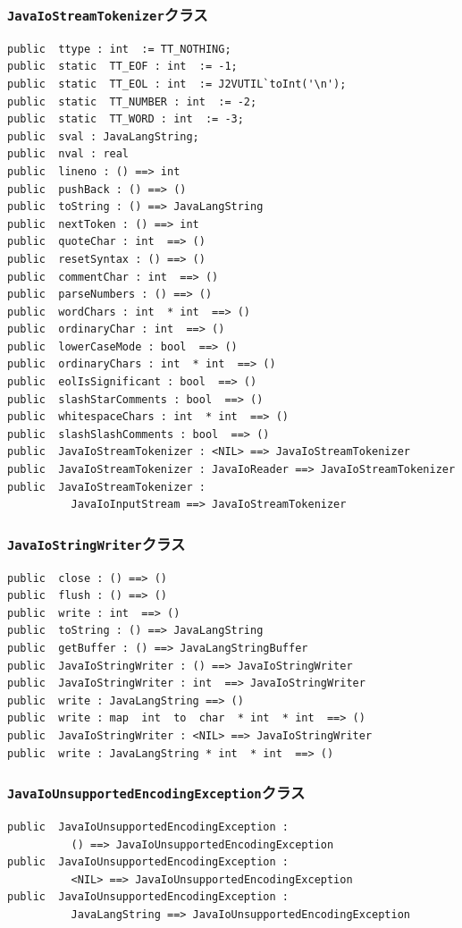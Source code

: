 \documentclass[\pformat,12pt]{jarticle}
\begin{document}
\subsubsection{\texttt{JavaIoStreamTokenizer}クラス}
\begin{small}
\begin{verbatim}
public  ttype : int  := TT_NOTHING;
public  static  TT_EOF : int  := -1;
public  static  TT_EOL : int  := J2VUTIL`toInt('\n');
public  static  TT_NUMBER : int  := -2;
public  static  TT_WORD : int  := -3;
public  sval : JavaLangString;
public  nval : real
public  lineno : () ==> int
public  pushBack : () ==> ()
public  toString : () ==> JavaLangString
public  nextToken : () ==> int
public  quoteChar : int  ==> ()
public  resetSyntax : () ==> ()
public  commentChar : int  ==> ()
public  parseNumbers : () ==> ()
public  wordChars : int  * int  ==> ()
public  ordinaryChar : int  ==> ()
public  lowerCaseMode : bool  ==> ()
public  ordinaryChars : int  * int  ==> ()
public  eolIsSignificant : bool  ==> ()
public  slashStarComments : bool  ==> ()
public  whitespaceChars : int  * int  ==> ()
public  slashSlashComments : bool  ==> ()
public  JavaIoStreamTokenizer : <NIL> ==> JavaIoStreamTokenizer
public  JavaIoStreamTokenizer : JavaIoReader ==> JavaIoStreamTokenizer
public  JavaIoStreamTokenizer : 
          JavaIoInputStream ==> JavaIoStreamTokenizer
\end{verbatim}
\end{small}

\subsubsection{\texttt{JavaIoStringWriter}クラス}
\begin{small}
\begin{verbatim}
public  close : () ==> ()
public  flush : () ==> ()
public  write : int  ==> ()
public  toString : () ==> JavaLangString
public  getBuffer : () ==> JavaLangStringBuffer
public  JavaIoStringWriter : () ==> JavaIoStringWriter
public  JavaIoStringWriter : int  ==> JavaIoStringWriter
public  write : JavaLangString ==> ()
public  write : map  int  to  char  * int  * int  ==> ()
public  JavaIoStringWriter : <NIL> ==> JavaIoStringWriter
public  write : JavaLangString * int  * int  ==> ()
\end{verbatim}
\end{small}

\subsubsection{\texttt{JavaIoUnsupportedEncodingException}クラス}
\begin{small}
\begin{verbatim}
public  JavaIoUnsupportedEncodingException : 
          () ==> JavaIoUnsupportedEncodingException
public  JavaIoUnsupportedEncodingException : 
          <NIL> ==> JavaIoUnsupportedEncodingException
public  JavaIoUnsupportedEncodingException : 
          JavaLangString ==> JavaIoUnsupportedEncodingException
\end{verbatim}
\end{small}
\end{document}
